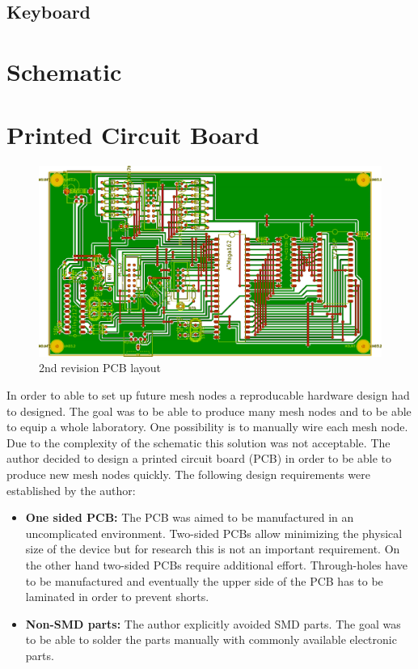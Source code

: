 \subsection{Keyboard}

\section{Schematic}




\section{Printed Circuit Board}
\begin{figure}[H]
\includegraphics[width=\textwidth]{figures/2nd_rev_pcb_layout.png}
\caption{2nd revision PCB layout}
\end{figure}

In order to able to set up future mesh nodes a reproducable hardware design had to designed. The goal was to be able to produce many mesh nodes and to be able to equip a whole laboratory. One possibility is to manually wire each mesh node. Due to the complexity of the schematic this solution was not acceptable. The author decided to design a printed circuit board (PCB) in order to be able to produce new mesh nodes quickly. The following design requirements were established by the author:

\begin{itemize}
\item \textbf{One sided PCB: } The PCB was aimed to be manufactured in an uncomplicated environment. Two-sided PCBs allow minimizing the physical size of the device but for research this is not an important requirement. On the other hand two-sided PCBs require additional effort. Through-holes have to be manufactured and eventually the upper side of the PCB has to be laminated in order to prevent shorts.
\item \textbf{Non-SMD parts: } The author explicitly avoided SMD parts. The goal was to be able to solder the parts manually with commonly available electronic parts.
\end{itemize}

